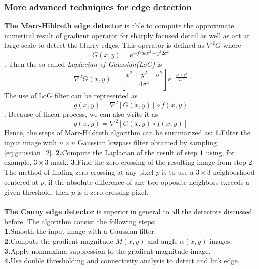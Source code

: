 \subsubsection{More advanced techniques for edge detection}
\textbf{The Marr-Hildreth edge detector} is able to compute the approximate numerical result of gradient operator for sharply focused detail as well as act at large scale to detect the blurry edges. This operator is defined as $\nabla^2 G$ where \begin{equation}G(x,y) = e^{-frac{x^2+y^2}{2\sigma^2}} \label{eq:gaussian_2}\end{equation}. Then the so-called \emph{Laplacian of Gaussian(LoG)} is \begin{equation} \nabla^2 G(x,y) = \left[ \frac{x^2+y^2-\sigma^2}{4\sigma^4} \right]e^{-\frac{x^2+y^2}{2\sigma^2}} \end{equation} The use of LoG filter can be represented as \begin{equation} g(x,y)=\nabla^2\left[G(x,y)\right]\circ f(x,y) \end{equation}. Because of linear process, we can also write it as \begin{equation} g(x,y)=\nabla^2\left[G(x,y)\circ f(x,y)\right] \end{equation} 
Hence, the steps of Marr-Hildreth algorithm can be summarized as: \textbf{1.}Filter the input image with $n\times n$ Gaussian lowpass filter obtained by sampling \ref{eq:gaussian_2}. \textbf{2.}Compute the Laplacian of the result of step \textbf{1} using, for example, $3\times 3$ mask. \textbf{3.}Find the zero crossing of the resulting image from step 2. \\
The method of finding zero crossing at any pixel $p$ is to use a $3\times 3$ neighborhood centered at $p$, if the absolute difference of any two opposite neighbors exceeds a given threshold, then $p$ is a zero-crossing pixel.\\
\\
\textbf{The Canny edge detector} is superior in general to all the detectors discussed before. The algorithm consist the following steps: \\
\textbf{1.}Smooth the input image with a Gaussian filter.\\ 
\textbf{2.}Compute the gradient magnitude $M(x,y)$ and angle $\alpha(x,y)$ images. \\
\textbf{3.}Apply nonmaxima suppression to the gradient magnitude image. \\
\textbf{4.}Use double thresholding and connectivity analysis to detect and link edge. \\
